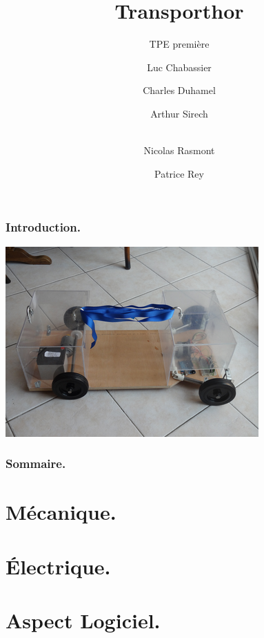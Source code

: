 \documentclass{beamer}
\title{Transporthor}
\subtitle{TPE première}
\author[Luc \and Charles \and Arthur \and Lucas \and Patrice]{Luc Chabassier \and Charles Duhamel \and Arthur Sirech \and\\ Nicolas Rasmont \and Patrice Rey}
\institute{Lycée Pierre de Fermat}
\begin{document}
\begin{frame}
	\maketitle
\end{frame}

\begin{frame}
	\frametitle{Introduction.}
    \begin{center}
        \includegraphics[width=0.95\linewidth]{rcs/intro.png}
    \end{center}
\end{frame}

\begin{frame}
	\frametitle{Sommaire.}
	\tableofcontents
\end{frame}

\section{Mécanique.}


\section{Électrique.}


\section{Aspect Logiciel.}

\end{document}
